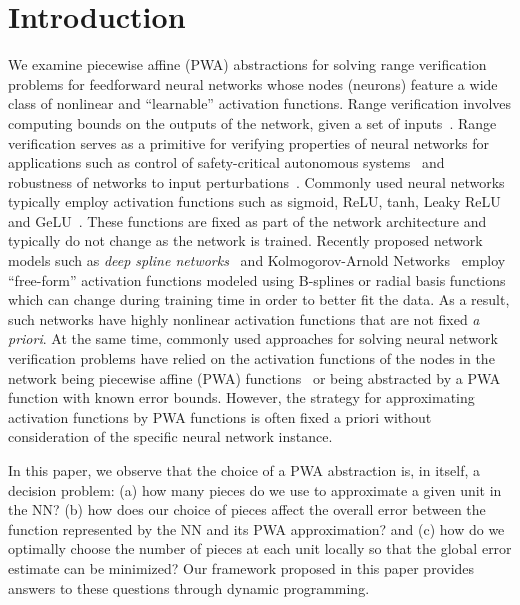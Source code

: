 \section{Introduction}\label{sec:intro}

We examine piecewise affine (PWA) abstractions for solving range verification problems for feedforward neural networks whose nodes (neurons) feature a wide class of nonlinear and ``learnable'' activation functions.  Range verification involves computing bounds on the outputs of the network, given a set of inputs~\cite{Liu+Others/2021/Algorithms,albarghouthi-book}. Range verification serves as a primitive for verifying properties of neural networks for applications such as control of safety-critical autonomous systems~\cite{Irfan+Others/2020/Towards,katz_barrett_dill_julian_kochenderfer_2017} and robustness of networks to input perturbations~\cite{tjeng_xiao_tedrake_2017,Casadio+Others/2022/NEural}. Commonly used neural networks typically employ activation functions such as sigmoid, ReLU, tanh, Leaky ReLU and GeLU~\cite{DUBEY202292}. These functions are fixed as part of the network architecture and typically do not change as the network is trained. Recently proposed network models such as \emph{deep spline networks}~\cite{Pakshal+Others/2020/Learning,Aziznejad+Others/2020/Deep} and Kolmogorov-Arnold Networks~\cite{li2024kolmogorovarnold,Liu+Others/2025/KAN} employ ``free-form'' activation functions modeled using B-splines or radial basis functions which can change during training time in order to better fit the data.
As a result, such networks have highly nonlinear activation functions  that are not fixed \emph{a priori}. At the same time, commonly used approaches for solving  neural network verification problems have relied on the activation functions of the nodes in the network being piecewise affine (PWA) functions~\cite{katz_barrett_dill_julian_kochenderfer_2017,tjeng_xiao_tedrake_2017} or being abstracted by a PWA function with known error bounds. %
However, the strategy for approximating activation functions by PWA functions is often fixed a priori without consideration of the specific neural network instance.


In this paper, we observe that the choice of a PWA abstraction is, in itself, a decision problem: (a) how many pieces do we use to approximate a given unit in the NN? (b) how does our choice of pieces affect the overall error between the function represented by the NN and its PWA approximation? and (c) how do we optimally choose the number of pieces at each unit locally so that the global error estimate can be minimized?  Our framework proposed in this paper provides answers to these questions through dynamic programming. %


